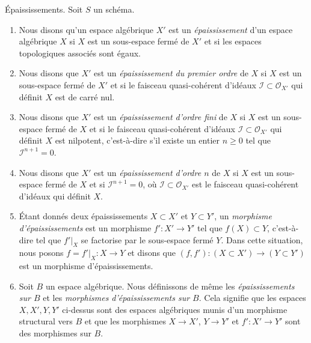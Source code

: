 \begin{definition}
\label{definition-thickening}
Épaississements. Soit $S$ un schéma.
\begin{enumerate}
\item Nous disons qu'un espace algébrique $X'$ est un {\it épaississement} d'un espace
algébrique $X$ si $X$ est un sous-espace fermé de $X'$ et si les espaces topologiques
associés sont égaux.
\item Nous disons que $X'$ est un {\it épaississement du premier ordre} de $X$ si
$X$ est un sous-espace fermé de $X'$ et si le faisceau quasi-cohérent d'idéaux
$\mathcal{I} \subset \mathcal{O}_{X'}$ qui définit $X$ est de carré nul.
\item Nous disons que $X'$ est un {\it épaississement d'ordre fini} de $X$
si $X$ est un sous-espace fermé de $X$ et si le faisceau quasi-cohérent d'idéaux
$\mathcal{I} \subset \mathcal{O}_{X'}$ qui définit $X$ est nilpotent, c'est-à-dire s'il
existe un entier $n \geq 0$ tel que $\mathcal{I}^{n + 1} = 0$.
\item Nous disons que $X'$ est un {\it épaississement d'ordre $n$} de $X$
si $X$ est un sous-espace fermé de $X$ et si $\mathcal{I}^{n + 1} = 0$,
où $\mathcal{I} \subset \mathcal{O}_{X'}$ est le
faisceau quasi-cohérent d'idéaux qui définit $X$.
\item Étant donnés deux épaississements $X \subset X'$ et $Y \subset Y'$, un
{\it morphisme d'épaississements} est un morphisme $f' : X' \to Y'$ tel que
$f(X) \subset Y$, c'est-à-dire tel que $f'|_X$ se factorise par le sous-espace
fermé $Y$. Dans cette situation, nous posons $f = f'|_X : X \to Y$ et disons
que $(f, f') : (X \subset X') \to (Y \subset Y')$ est un morphisme
d'épaississements.
\item Soit $B$ un espace algébrique. Nous définissons de même les
{\it épaississements sur $B$} et les
{\it morphismes d'épaississements sur $B$}. Cela signifie que les espaces
$X, X', Y, Y'$ ci-dessus sont des espaces algébriques munis d'un morphisme
structural vers $B$ et que les morphismes
$X \to X'$, $Y \to Y'$ et $f' : X' \to Y'$ sont des morphismes sur $B$.
\end{enumerate}
\end{definition}

